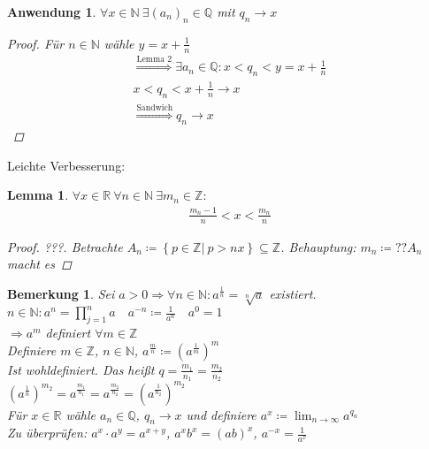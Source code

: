 \documentclass[11pt, twoside, a4paper]{article}
\theoremstyle{plain}
\newtheorem{bemerkung}[blockelement]{Bemerkung}
\newtheorem{lemma}[blockelement]{Lemma}
\newtheorem{anwendung}[blockelement]{Anwendung}
\newcommand{\set}[1]{\left\{#1\right\}}
\newcommand{\pair}[1]{\left(#1\right)}
\newcommand{\impl}[0]{\Rightarrow{}}
\newcommand{\definedas}[0]{\coloneqq}
\newcommand{\annot}[2]{\overset{\text{#2}}{#1}}
\newcommand{\fromto}{\rightarrow{}}
\newcommand{\naturalnumbers}{\mathbb{N}}
\newcommand{\realnumbers}{\mathbb{R}}
\begin{document}
    \begin{anwendung}
        $\forall x\in\naturalnumbers~\exists (a_n)_n\in\mathbb{Q}$ mit $q_n\fromto x$
        \begin{proof}
            Für $n\in\naturalnumbers$ wähle $y=x+\frac{1}{n}$
            \begin{align*}
                \annot{\impl}{Lemma 2} \exists a_n\in\mathbb{Q}\colon x < q_n < y = x + \frac{1}{n}\\
                x < q_n < x + \frac{1}{n} \fromto x\\
                \annot{\impl}{Sandwich} q_n \fromto x
            \end{align*}
        \end{proof}
    \end{anwendung}

    Leichte Verbesserung:

    \begin{lemma} %
        $\forall x\in\realnumbers~\forall n\in\naturalnumbers~\exists m_n\in\mathbb{Z}\colon$
        \begin{align*}
            \frac{m_n-1}{n} < x < \frac{m_n}{n}
        \end{align*}
        \begin{proof}
            ???. Betrachte $A_n\definedas\set{p\in\mathbb{Z}|~p>nx}\subseteq\mathbb{Z}$. Behauptung: $m_n\definedas ?? A_n$ macht es
        \end{proof}
    \end{lemma}

    \begin{bemerkung}
        Sei $a > 0 \impl \forall n\in\naturalnumbers\colon a^{\frac{1}{n}} = \sqrt[n]{a}$ existiert.\\
        $n\in\naturalnumbers\colon a^n = \prod_{j=1}^n a\quad a^{-n} \definedas \frac{1}{a^n}\quad a^0 = 1$\\
        $\impl a^m$ definiert $\forall m\in\mathbb{Z}$\\
        Definiere $m\in\mathbb{Z}$, $n\in\naturalnumbers$, $a^\frac{m}{n}\definedas \pair{a^\frac{1}{m}}^m$\\
        Ist wohldefiniert. Das heißt $q=\frac{m_1}{n_1} = \frac{m_2}{n_2}$\\
        $\pair{a^\frac{1}{n}}^{m_2} = a^\frac{m_1}{n_1} = a^\frac{m_2}{n_2} = \pair{a^\frac{1}{n_2}}^{m_2}$\\
        Für $x\in\realnumbers$ wähle $a_n\in\mathbb{Q}$, $q_n\fromto x$ und definiere $a^x \definedas\lim_{n\fromto\infty} a^{q_n}$\\
        Zu überprüfen: $a^x\cdot a^y = a^{x+y}$, $a^{x}b^x = (ab)^x$, $a^{-x} = \frac{1}{a^x}$
    \end{bemerkung}
\end{document}

